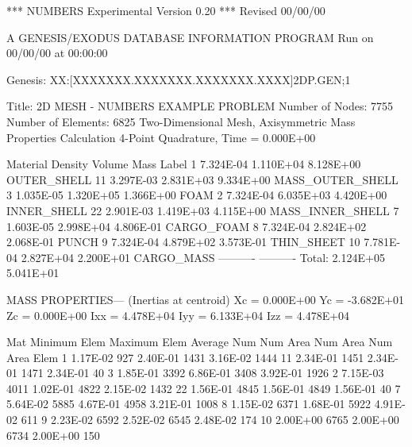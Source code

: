                     *** NUMBERS Experimental Version 0.20 ***
                                Revised 00/00/00

                  A GENESIS/EXODUS DATABASE INFORMATION PROGRAM
                           Run on 00/00/00 at 00:00:00

     Genesis: XX:[XXXXXXX.XXXXXXX.XXXXXXX.XXXX]2DP.GEN;1

     Title:   2D MESH - NUMBERS EXAMPLE PROBLEM
     Number of Nodes:      7755
     Number of Elements:   6825
     Two-Dimensional Mesh, Axisymmetric
     Mass Properties Calculation
     4-Point Quadrature, Time =  0.000E+00

     Material    Density        Volume          Mass        Label
         1      7.324E-04      1.110E+04      8.128E+00     OUTER_SHELL
        11      3.297E-03      2.831E+03      9.334E+00     MASS_OUTER_SHELL
         3      1.035E-05      1.320E+05      1.366E+00     FOAM
         2      7.324E-04      6.035E+03      4.420E+00     INNER_SHELL
        22      2.901E-03      1.419E+03      4.115E+00     MASS_INNER_SHELL
         7      1.603E-05      2.998E+04      4.806E-01     CARGO_FOAM
         8      7.324E-04      2.824E+02      2.068E-01     PUNCH
         9      7.324E-04      4.879E+02      3.573E-01     THIN_SHEET
        10      7.781E-04      2.827E+04      2.200E+01     CARGO_MASS
                              ----------     ----------
                  Total:       2.124E+05      5.041E+01

     MASS PROPERTIES--- (Inertias at centroid)
      Xc =  0.000E+00   Yc = -3.682E+01   Zc =  0.000E+00
     Ixx =  4.478E+04  Iyy =  6.133E+04  Izz =  4.478E+04

     Mat  Minimum   Elem   Maximum   Elem   Average   Num
     Num    Area    Num      Area    Num      Area    Elem
      1   1.17E-02   927   2.40E-01  1431   3.16E-02  1444
     11   2.34E-01  1451   2.34E-01  1471   2.34E-01    40
      3   1.85E-01  3392   6.86E-01  3408   3.92E-01  1926
      2   7.15E-03  4011   1.02E-01  4822   2.15E-02  1432
     22   1.56E-01  4845   1.56E-01  4849   1.56E-01    40
      7   5.64E-02  5885   4.67E-01  4958   3.21E-01  1008
      8   1.15E-02  6371   1.68E-01  5922   4.91E-02   611
      9   2.23E-02  6592   2.52E-02  6545   2.48E-02   174
     10   2.00E+00  6765   2.00E+00  6734   2.00E+00   150
